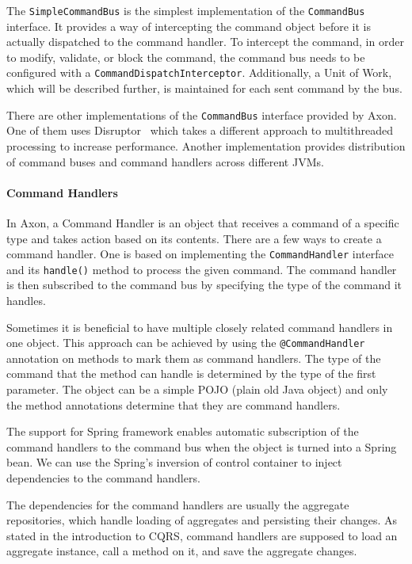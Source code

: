 \documentclass{book}
\begin{document}
The \texttt{SimpleCommandBus} is the simplest implementation of the
\texttt{CommandBus} interface. It provides a way of intercepting the
command object before it is actually dispatched to the command handler.
To intercept the command, in order to modify, validate, or block the
command, the command bus needs to be configured with a
\texttt{CommandDispatchInterceptor}. Additionally, a Unit of Work, which
will be described further, is maintained for each sent command by the
bus.

There are other implementations of the \texttt{CommandBus} interface
provided by Axon. One of them uses Disruptor~\cite{disruptor} which
takes a different approach to multithreaded processing to increase
performance. Another implementation provides distribution of command
buses and command handlers across different JVMs.

\paragraph{Command Handlers}\label{command-handlers}

In Axon, a Command Handler is an object that receives a command of a
specific type and takes action based on its contents. There are a few
ways to create a command handler. One is based on implementing the
\texttt{CommandHandler} interface and its \texttt{handle()} method to
process the given command. The command handler is then subscribed to the
command bus by specifying the type of the command it handles.

Sometimes it is beneficial to have multiple closely related command
handlers in one object. This approach can be achieved by using the
\texttt{@CommandHandler} annotation on methods to mark them as command
handlers. The type of the command that the method can handle is
determined by the type of the first parameter. The object can be a
simple POJO (plain old Java object) and only the method annotations
determine that they are command handlers.

The support for Spring framework enables automatic subscription of the
command handlers to the command bus when the object is turned into a
Spring bean. We can use the Spring's inversion of control container to
inject dependencies to the command handlers.

The dependencies for the command handlers are usually the aggregate
repositories, which handle loading of aggregates and persisting their
changes. As stated in the introduction to CQRS, command handlers are
supposed to load an aggregate instance, call a method on it, and save
the aggregate changes.
\end{document}

